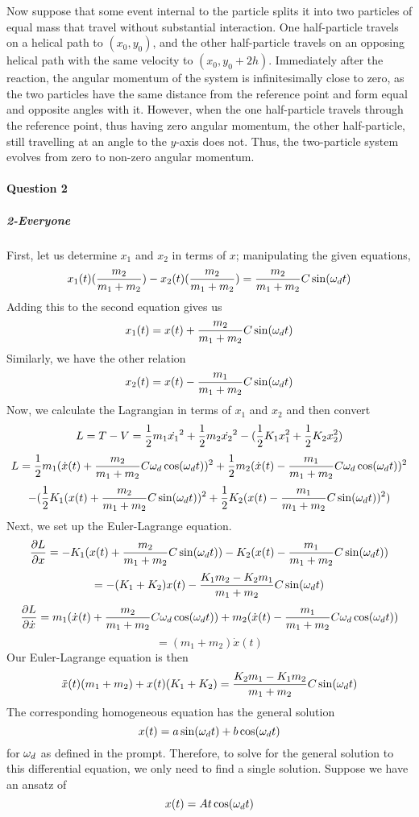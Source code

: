 Now suppose that some event internal to the particle splits it into two particles of equal mass that travel without substantial interaction.  One half-particle travels on a helical path to $(x_0, y_0)$, and the other half-particle travels on an opposing helical path with the same velocity to $(x_0, y_0 + 2h)$.  Immediately after the reaction, the angular momentum of the system is infinitesimally close to zero, as the two particles have the same distance from the reference point and form equal and opposite angles with it.  However, when the one half-particle travels through the reference point, thus having zero angular momentum, the other half-particle, still travelling at an angle to the $y$-axis does not.  Thus, the two-particle system evolves from zero to non-zero angular momentum.

\paragraph{Question 2}
\subparagraph{2-Everyone}
First, let us determine $x_1$ and $x_2$ in terms of $x$; manipulating the given equations,
$$x_1(t)(\frac{m_2}{m_1+m_2})-x_2(t)(\frac{m_2}{m_1+m_2})=\frac{m_2}{m_1+m_2} C\sin(\omega_d t)$$
Adding this to the second equation gives us
$$x_1(t)=x(t)+\frac{m_2}{m_1+m_2} C\sin(\omega_d t)$$
Similarly, we have the other relation
$$x_2(t)=x(t)-\frac{m_1}{m_1+m_2}C\sin(\omega_d t)$$
Now, we calculate the Lagrangian in terms of $x_1$ and $x_2$ and then convert
$$L=T-V=\frac 1 2 m_1 \dot{x_1}^2+\frac 1 2 m_2 \dot{x_2}^2-(\frac 1 2 K_1 x_1^2+\frac 1 2 K_2 x_2^2)$$
$$L=\frac 1 2 m_1(\dot x(t)+\frac{m_2}{m_1+m_2} C\omega_d \cos(\omega_d t))^2+\frac 1 2 m_2(\dot x(t) -\frac{m_1}{m_1+m_2} C\omega_d \cos(\omega_d t))^2$$
$$-(\frac 1 2 K_1 (x(t)+\frac{m_2}{m_1+m_2} C\sin(\omega_d t))^2+\frac 1 2 K_2 ( x(t)-\frac{m_1}{m_1+m_2} C\sin(\omega_d t))^2)$$
Next, we set up the Euler-Lagrange equation.
$$\frac{\partial L}{\partial x}=-K_1 (x(t)+\frac{m_2}{m_1+m_2}C\sin(\omega_d t))-K_2 (x(t)-\frac{m_1}{m_1+m_2} C\sin(\omega_d t))$$
$$=-(K_1+K_2) x(t)-\frac{K_1 m_2-K_2 m_1}{m_1+m_2}C \sin(\omega_d t)$$
$$\frac{\partial L}{\partial \dot x} = m_1 (\dot x(t)+\frac{m_2}{m_1+m_2} C \omega_d \cos(\omega_d t))+m_2  (\dot x(t)-\frac{m_1}{m_1+m_2} C \omega_d \cos(\omega_d t))$$
$$= (m_1+m_2) \dot x(t)$$
Our Euler-Lagrange equation is then
$$\ddot x(t) (m_1+m_2)+ x(t) (K_1+K_2)=\frac{K_2 m_1-K_1 m_2}{m_1+m_2} C \sin(\omega_d t)$$
The corresponding homogeneous equation has the general solution
$$x(t)= a \sin(\omega_d t)+b\cos(\omega_d t)$$
for $\omega_d$ as defined in the prompt.  Therefore, to solve for the general solution to this differential equation, we only need to find a single solution.  Suppose we have an ansatz of
$$x(t)=A t\cos(\omega_d t)$$
